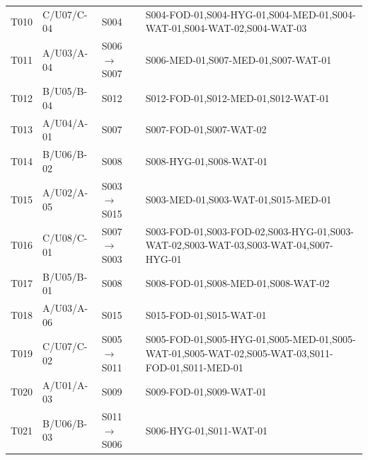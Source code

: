 \begin{longtable}{@{}>{\centering\arraybackslash}p{1.00cm}>{\raggedright\arraybackslash}p{2.80cm}>{\raggedright\arraybackslash}p{3.10cm}>{\raggedright\arraybackslash}p{7.60cm}@{}}
T010 & C/U07/C-04 & S004 & \mbox{S004-FOD-01},\allowbreak \mbox{S004-HYG-01},\allowbreak \mbox{S004-MED-01},\allowbreak \mbox{S004-WAT-01},\allowbreak \mbox{S004-WAT-02},\allowbreak \mbox{S004-WAT-03} \\
T011 & A/U03/A-04 & S006$\to$S007 & \mbox{S006-MED-01},\allowbreak \mbox{S007-MED-01},\allowbreak \mbox{S007-WAT-01} \\
T012 & B/U05/B-04 & S012 & \mbox{S012-FOD-01},\allowbreak \mbox{S012-MED-01},\allowbreak \mbox{S012-WAT-01} \\
T013 & A/U04/A-01 & S007 & \mbox{S007-FOD-01},\allowbreak \mbox{S007-WAT-02} \\
T014 & B/U06/B-02 & S008 & \mbox{S008-HYG-01},\allowbreak \mbox{S008-WAT-01} \\
T015 & A/U02/A-05 & S003$\to$S015 & \mbox{S003-MED-01},\allowbreak \mbox{S003-WAT-01},\allowbreak \mbox{S015-MED-01} \\
T016 & C/U08/C-01 & S007$\to$S003 & \mbox{S003-FOD-01},\allowbreak \mbox{S003-FOD-02},\allowbreak \mbox{S003-HYG-01},\allowbreak \mbox{S003-WAT-02},\allowbreak \mbox{S003-WAT-03},\allowbreak \mbox{S003-WAT-04},\allowbreak \mbox{S007-HYG-01} \\
T017 & B/U05/B-01 & S008 & \mbox{S008-FOD-01},\allowbreak \mbox{S008-MED-01},\allowbreak \mbox{S008-WAT-02} \\
T018 & A/U03/A-06 & S015 & \mbox{S015-FOD-01},\allowbreak \mbox{S015-WAT-01} \\
T019 & C/U07/C-02 & S005$\to$S011 & \mbox{S005-FOD-01},\allowbreak \mbox{S005-HYG-01},\allowbreak \mbox{S005-MED-01},\allowbreak \mbox{S005-WAT-01},\allowbreak \mbox{S005-WAT-02},\allowbreak \mbox{S005-WAT-03},\allowbreak \mbox{S011-FOD-01},\allowbreak \mbox{S011-MED-01} \\
T020 & A/U01/A-03 & S009 & \mbox{S009-FOD-01},\allowbreak \mbox{S009-WAT-01} \\
T021 & B/U06/B-03 & S011$\to$S006 & \mbox{S006-HYG-01},\allowbreak \mbox{S011-WAT-01} \\
\end{longtable}
\endgroup
